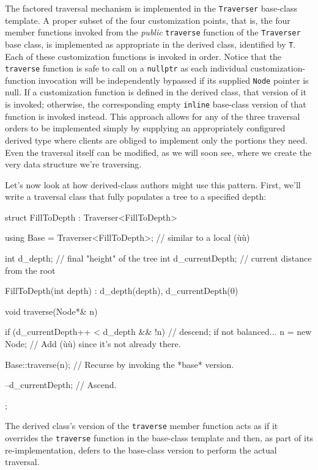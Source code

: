 \noindent The factored traversal mechanism is implemented in the
\lstinline!Traverser! base-class template. A proper subset of the four
customization points, that is, the four member functions invoked from
the \emph{public} \lstinline!traverse! function of the \lstinline!Traverser!
base class, is implemented as appropriate in the derived class,
identified by \lstinline!T!. Each of these customization functions is
invoked in order. Notice that the \lstinline!traverse! function is safe to call on a
\lstinline!nullptr! as each individual customization-function invocation
will be independently bypassed if its supplied \lstinline!Node! pointer is
null. If a customization function is defined in the derived class, that
version of it is invoked; otherwise, the corresponding empty
\lstinline!inline! base-class version of that function is invoked instead.
This approach allows for any of the three traversal orders to be
implemented simply by supplying an appropriately configured derived type
where clients are obliged to implement only the portions they need. Even
the traversal itself can be modified, as we will soon see, where we
create the very data structure we're traversing.

Let's now look at how derived-class authors might use this pattern.
First, we'll write a traversal class that fully populates a tree to a
specified depth:

\begin{emcppslisting}[emcppsbatch=e9]
struct FillToDepth : Traverser<FillToDepth>
{
    using Base = Traverser<FillToDepth>;  // similar to a local (ù{}ù)

    int d_depth;            //  final "height" of the tree
    int d_currentDepth;     //  current distance from the root

    FillToDepth(int depth) : d_depth(depth), d_currentDepth(0) { }

    void traverse(Node*& n)
    {
        if (d_currentDepth++ < d_depth && !n)  // descend; if not balanced...
        {
            n = new Node;     // Add (ù{}ù) since it's not already there.
        }

        Base::traverse(n);    // Recurse by invoking the *base* version.

        --d_currentDepth;     // Ascend.
    }
};
\end{emcppslisting}

\noindent The derived class's version of the \lstinline!traverse! member function
acts as if it overrides the \lstinline!traverse! function in the base-class
template and then, as part of its re-implementation, defers to the base-class version to perform the actual traversal.

